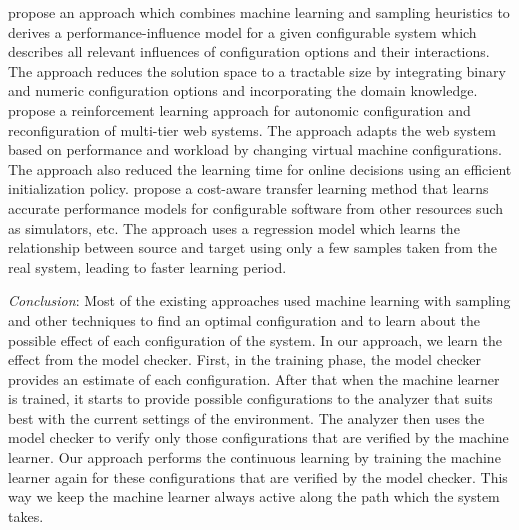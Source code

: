 \documentclass[a4paper,12pt]{article}
\begin{document}
\cite{PIMFHCS-2015} propose an approach which combines machine learning and sampling heuristics to derives a performance-influence model for a given configurable system which describes all relevant influences of configuration options and their interactions. The approach reduces the solution space to a tractable size by integrating binary and numeric configuration options and incorporating the domain knowledge. \cite{ARLATOWSAC-2009} propose a reinforcement learning approach for autonomic configuration and reconfiguration of multi-tier web systems. The approach adapts the web system based on performance and workload by changing virtual machine configurations. The approach also reduced the learning time for online decisions using an efficient initialization policy. \cite{TLFIMPIHCS-2017} propose a cost-aware transfer learning method that learns accurate performance models for configurable software from other resources such as simulators, etc. The approach uses a regression model which learns the relationship between source and target using only a few samples taken from the real system, leading to faster learning period.

\emph{Conclusion}: Most of the existing approaches used machine learning with sampling and other techniques to find an optimal configuration and to learn about the possible effect of each configuration of the system. In our approach, we learn the effect from the model checker. First, in the training phase, the model checker provides an estimate of each configuration. After that when the machine learner is trained, it starts to provide possible configurations to the analyzer that suits best with the current settings of the environment. The analyzer then uses the model checker to verify only those configurations that are verified by the machine learner. Our approach performs the continuous learning by training the machine learner again for these configurations that are verified by the model checker. This way we keep the machine learner always active along the path which the system takes.
\newpage
\end{document}
